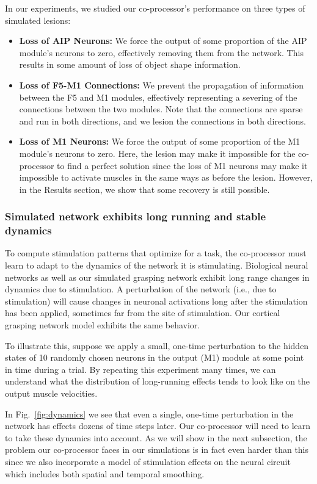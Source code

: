 \documentclass[12pt]{iopart}
\begin{document}
In our experiments, we studied our co-processor's performance on three types of
simulated lesions:
\begin{itemize}
	\item \textbf{Loss of AIP Neurons:} We force the output of some proportion of the AIP module's
	      neurons to zero, effectively removing them from the network. This results in some amount of 
	      loss of object shape information.
	\item \textbf{Loss of F5-M1 Connections:} We prevent the propagation of
	      information between the F5 and M1 modules, effectively representing a
	      severing of the connections between the two modules. Note that the connections are sparse
	      and run in both directions, and we lesion the connections in both directions.
	\item \textbf{Loss of M1 Neurons:} We force the output of some proportion of the M1 module's
	      neurons to zero. Here, the lesion may make it impossible for the co-processor
	      to find a perfect solution since the loss of M1 neurons may make it impossible to
	      activate muscles in the same ways as before the lesion. However, in the Results section,
        we show that some recovery is still possible.
\end{itemize}

\subsubsection{Simulated network exhibits long running and stable dynamics}
To compute stimulation patterns that optimize for a task, the co-processor must
learn to adapt to the dynamics of the network it is stimulating. Biological neural
networks as well as our simulated grasping network exhibit long range changes in dynamics
due to stimulation. A perturbation of the network (i.e., due to stimulation) will cause
changes in neuronal activations long after the stimulation has been applied, sometimes far
from the site of stimulation. Our cortical grasping network model exhibits the same
behavior.

To illustrate this, suppose we apply a small, one-time perturbation
to the hidden states of 10 randomly chosen neurons in the output (M1) module at some point
in time during a trial. By repeating this experiment many times, we can understand what the
distribution of long-running effects tends to look like on the output muscle velocities.

In Fig.~\ref{fig:dynamics} we see that even a single, one-time perturbation in
the network has effects dozens of time steps later. Our co-processor will need to learn to take
these dynamics into account. As we will show in the next subsection, the problem our co-processor
faces in our simulations is in fact even harder than this since we also incorporate
a model of stimulation effects on the neural circuit which includes both spatial and temporal
smoothing.
\end{document}

